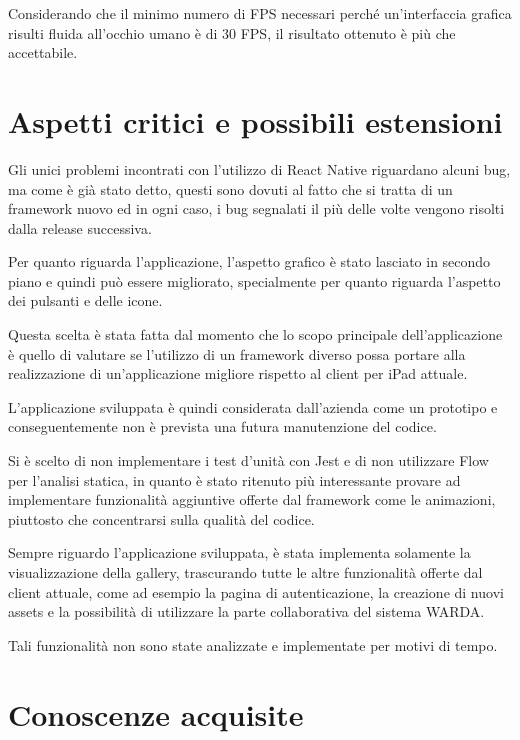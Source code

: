 Considerando che il minimo numero di FPS necessari perché un'interfaccia grafica risulti fluida all'occhio umano è di 30 FPS, il risultato ottenuto è più che accettabile.

\section{Aspetti critici e possibili estensioni}

Gli unici problemi incontrati con l'utilizzo di React Native riguardano alcuni bug, ma come è già stato detto, questi sono dovuti al fatto che si tratta di un framework nuovo ed in ogni caso, i bug segnalati il più delle volte vengono risolti dalla release successiva.

Per quanto riguarda l'applicazione, l'aspetto grafico è stato lasciato in secondo piano e quindi può essere migliorato, specialmente per quanto riguarda l'aspetto dei pulsanti e delle icone.

Questa scelta è stata fatta dal momento che lo scopo principale dell'applicazione è quello di valutare se l'utilizzo di un framework diverso possa portare alla realizzazione di un'applicazione migliore rispetto al client per iPad attuale.

L'applicazione sviluppata è quindi considerata dall'azienda come un prototipo e conseguentemente non è prevista una futura manutenzione del codice. 

Si è scelto di non implementare i test d'unità con Jest e di non utilizzare Flow per l'analisi statica, in quanto è stato ritenuto più interessante provare ad implementare funzionalità aggiuntive offerte dal framework come le animazioni, piuttosto che concentrarsi sulla qualità del codice.


Sempre riguardo l'applicazione sviluppata, è stata implementa solamente la visualizzazione della gallery, trascurando tutte le altre funzionalità offerte dal client attuale, come ad esempio la pagina di autenticazione, la creazione di nuovi assets e la possibilità di utilizzare la parte collaborativa del sistema WARDA.

Tali funzionalità non sono state analizzate e implementate per motivi di tempo.

\section{Conoscenze acquisite}

